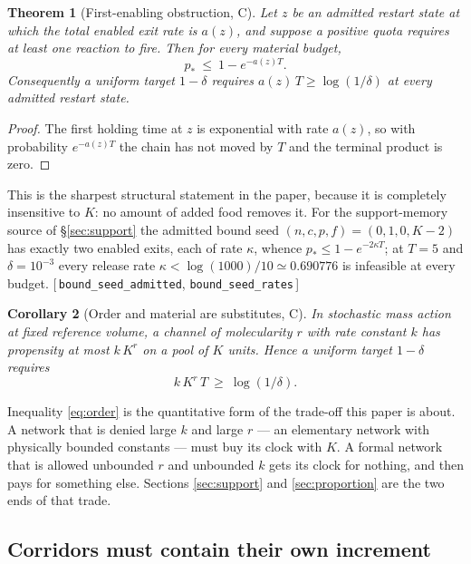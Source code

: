 \documentclass[11pt]{article}
\theoremstyle{plain}
\newtheorem{theorem}{Theorem}[section]
\newtheorem{corollary}[theorem]{Corollary}
\theoremstyle{definition}
\theoremstyle{remark}
\newcommand{\leanref}[1]{{\normalfont\sffamily\footnotesize[\,#1\,]}}
\begin{document}
\begin{theorem}[First-enabling obstruction, C]\label{thm:clock}
Let $z$ be an admitted restart state at which the total enabled exit rate is
$a(z)$, and suppose a positive quota requires at least one reaction to fire.
Then for every material budget,
\begin{equation}\label{eq:clock}
p_*\ \le\ 1-e^{-a(z)T}.
\end{equation}
Consequently a uniform target $1-\delta$ requires $a(z)\,T\ge\log(1/\delta)$
at every admitted restart state.
\end{theorem}

\begin{proof}
The first holding time at $z$ is exponential with rate $a(z)$, so with
probability $e^{-a(z)T}$ the chain has not moved by $T$ and the terminal
product is zero. \end{proof}

This is the sharpest structural statement in the paper, because it is
completely insensitive to $K$: no amount of added food removes it. For the
support-memory source of \S\ref{sec:support} the admitted bound seed
$(n,c,p,f)=(0,1,0,K-2)$ has exactly two enabled exits, each of rate $\kappa$,
whence $p_*\le1-e^{-2\kappa T}$; at $T=5$ and $\delta=10^{-3}$ every release
rate $\kappa<\log(1000)/10\simeq0.690776$ is infeasible at every budget.
\leanref{\texttt{bound\_seed\_admitted}, \texttt{bound\_seed\_rates}}

\begin{corollary}[Order and material are substitutes, C]\label{cor:order}
In stochastic mass action at fixed reference volume, a channel of molecularity
$r$ with rate constant $k$ has propensity at most $k\,K^{r}$ on a pool of $K$
units. Hence a uniform target $1-\delta$ requires
\begin{equation}\label{eq:order}
k\,K^{r}\,T\ \ge\ \log(1/\delta).
\end{equation}
\end{corollary}

Inequality \eqref{eq:order} is the quantitative form of the trade-off this
paper is about. A network that is denied large $k$ and large $r$ --- an
elementary network with physically bounded constants --- must buy its clock
with $K$. A formal network that is allowed unbounded $r$ and unbounded $k$
gets its clock for nothing, and then pays for something else. Sections
\ref{sec:support} and \ref{sec:proportion} are the two ends of that trade.

\subsection{Corridors must contain their own increment}
\end{document}

